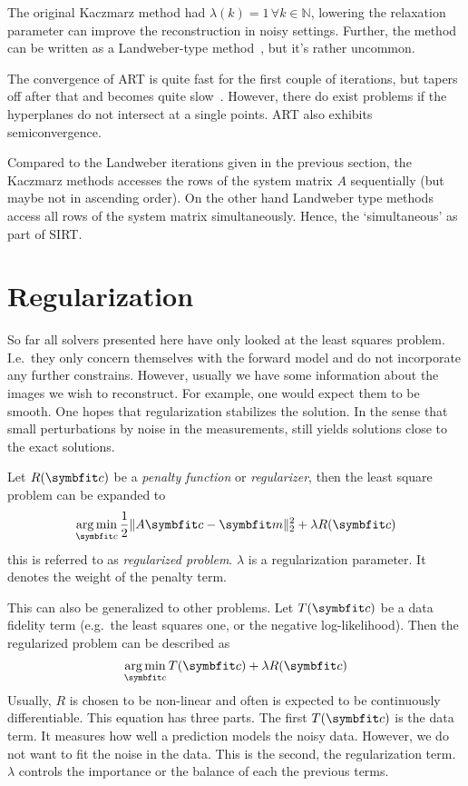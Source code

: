 The original Kaczmarz method had \(\lambda(k) = 1\, \forall k \in \mathbb{N}\), lowering the
relaxation parameter can improve the reconstruction in noisy settings. Further, the method can be
written as a Landweber-type method~\cite{hansen_discrete_2010}, but it's rather uncommon.

The convergence of \gls{ART} is quite fast for the first couple of iterations, but tapers off after
that and becomes quite slow~\cite{hansen_discrete_2010}. However, there do exist problems if the
hyperplanes do not intersect at a single points. \gls{ART} also exhibits semiconvergence.

Compared to the Landweber iterations given in the previous section, the Kaczmarz methods accesses
the rows of the system matrix \(A\) sequentially (but maybe not in ascending order). On the other
hand Landweber type methods access all rows of the system matrix simultaneously. Hence, the
`simultaneous' as part of \gls{SIRT}\@.

\section{Regularization}\label{sec:regularization}

So far all solvers presented here have only looked at the least squares problem. I.e.\ they only
concern themselves with the forward model and do not incorporate any further constrains. However,
usually we have some information about the images we wish to reconstruct. For example, one would
expect them to be smooth. One hopes that regularization stabilizes the solution. In the sense that
small perturbations by noise in the measurements, still yields solutions close to the exact
solutions.

\begin{definition}\label{def:regularized_problem}
	Let \(R(\mvec{c})\) be a \textit{penalty function} or \textit{regularizer}, then the least
	square problem can be expanded to
	\[
		\argmin_{\mvec{c}} \frac{1}{2} \norm{A \mvec{c} - \mvec{m}}_2^2 + \lambda R(\mvec{c})
	\]
	this is referred to as \textit{regularized problem}. \(\lambda\) is a regularization
	parameter. It denotes the weight of the penalty term.
\end{definition}

This can also be generalized to other problems. Let \(T(\mvec{c})\) be a data fidelity term (e.g.\
the least squares one, or the negative log-likelihood). Then the regularized problem can be
described as
\begin{equation}\label{eq:optimization_problem}
	\argmin_{\mvec{c}} T(\mvec{c}) + \lambda R(\mvec{c})
\end{equation}
Usually, \(R\) is chosen to be non-linear and often is expected to be continuously differentiable.
This equation has three parts. The first \(T(\mvec{c})\) is the data term. It measures how well a
prediction models the noisy data. However, we do not want to fit the noise in the data. This is the
second, the regularization term. \(\lambda\) controls the importance or the balance of each the
previous terms.


